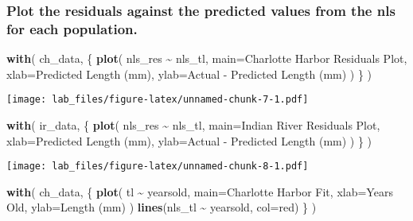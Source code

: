 \documentclass[
]{article}
\newenvironment{Shaded}{\begin{snugshade}}{\end{snugshade}}
\newcommand{\DataTypeTok}[1]{\textcolor[rgb]{0.13,0.29,0.53}{#1}}
\newcommand{\KeywordTok}[1]{\textcolor[rgb]{0.13,0.29,0.53}{\textbf{#1}}}
\newcommand{\NormalTok}[1]{#1}
\newcommand{\OperatorTok}[1]{\textcolor[rgb]{0.81,0.36,0.00}{\textbf{#1}}}
\newcommand{\StringTok}[1]{\textcolor[rgb]{0.31,0.60,0.02}{#1}}
\begin{document}
\hypertarget{plot-the-residuals-against-the-predicted-values-from-the-nls-for-each-population.}{%
\subsubsection{Plot the residuals against the predicted values from the
nls for each
population.}\label{plot-the-residuals-against-the-predicted-values-from-the-nls-for-each-population.}}

\begin{Shaded}
\begin{Highlighting}[]
\KeywordTok{with}\NormalTok{(}
\NormalTok{  ch\_data, \{}
    \KeywordTok{plot}\NormalTok{(}
\NormalTok{      nls\_res }\OperatorTok{\textasciitilde{}}\StringTok{ }\NormalTok{nls\_tl,}
      \DataTypeTok{main=}\StringTok{\textquotesingle{}Charlotte Harbor Residuals Plot\textquotesingle{}}\NormalTok{,}
      \DataTypeTok{xlab=}\StringTok{\textquotesingle{}Predicted Length (mm)\textquotesingle{}}\NormalTok{,}
      \DataTypeTok{ylab=}\StringTok{\textquotesingle{}Actual {-} Predicted Length (mm)\textquotesingle{}}
\NormalTok{    )}
\NormalTok{  \}}
\NormalTok{)}
\end{Highlighting}
\end{Shaded}

\texttt{[image: lab\_files/figure-latex/unnamed-chunk-7-1.pdf]}

\begin{Shaded}
\begin{Highlighting}[]
\KeywordTok{with}\NormalTok{(}
\NormalTok{  ir\_data, \{}
    \KeywordTok{plot}\NormalTok{(}
\NormalTok{      nls\_res }\OperatorTok{\textasciitilde{}}\StringTok{ }\NormalTok{nls\_tl,}
      \DataTypeTok{main=}\StringTok{\textquotesingle{}Indian River Residuals Plot\textquotesingle{}}\NormalTok{,}
      \DataTypeTok{xlab=}\StringTok{\textquotesingle{}Predicted Length (mm)\textquotesingle{}}\NormalTok{,}
      \DataTypeTok{ylab=}\StringTok{\textquotesingle{}Actual {-} Predicted Length (mm)\textquotesingle{}}
\NormalTok{    )}
\NormalTok{  \}}
\NormalTok{)}
\end{Highlighting}
\end{Shaded}

\texttt{[image: lab\_files/figure-latex/unnamed-chunk-8-1.pdf]}

\begin{Shaded}
\begin{Highlighting}[]
\KeywordTok{with}\NormalTok{(}
\NormalTok{  ch\_data, \{}
    \KeywordTok{plot}\NormalTok{(}
\NormalTok{      tl }\OperatorTok{\textasciitilde{}}\StringTok{ }\NormalTok{yearsold,}
      \DataTypeTok{main=}\StringTok{\textquotesingle{}Charlotte Harbor Fit\textquotesingle{}}\NormalTok{,}
      \DataTypeTok{xlab=}\StringTok{\textquotesingle{}Years Old\textquotesingle{}}\NormalTok{,}
      \DataTypeTok{ylab=}\StringTok{\textquotesingle{}Length (mm)\textquotesingle{}}
\NormalTok{    )}
    \KeywordTok{lines}\NormalTok{(nls\_tl }\OperatorTok{\textasciitilde{}}\StringTok{ }\NormalTok{yearsold, }\DataTypeTok{col=}\StringTok{\textquotesingle{}red\textquotesingle{}}\NormalTok{)}
\NormalTok{  \}}
\NormalTok{)}
\end{Highlighting}
\end{Shaded}
\end{document}

